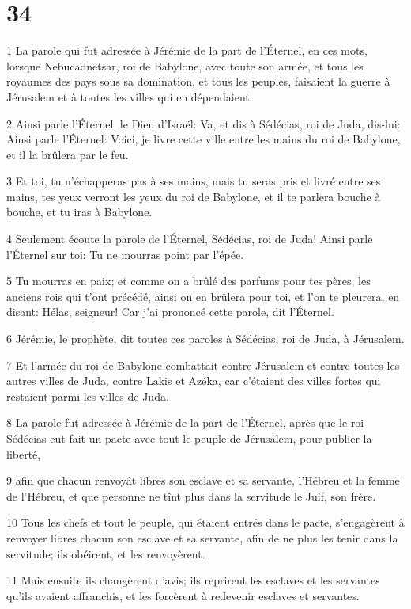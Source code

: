 \chapter{34}

\par 1 La parole qui fut adressée à Jérémie de la part de l'Éternel, en ces mots, lorsque Nebucadnetsar, roi de Babylone, avec toute son armée, et tous les royaumes des pays sous sa domination, et tous les peuples, faisaient la guerre à Jérusalem et à toutes les villes qui en dépendaient:
\par 2 Ainsi parle l'Éternel, le Dieu d'Israël: Va, et dis à Sédécias, roi de Juda, dis-lui: Ainsi parle l'Éternel: Voici, je livre cette ville entre les mains du roi de Babylone, et il la brûlera par le feu.
\par 3 Et toi, tu n'échapperas pas à ses mains, mais tu seras pris et livré entre ses mains, tes yeux verront les yeux du roi de Babylone, et il te parlera bouche à bouche, et tu iras à Babylone.
\par 4 Seulement écoute la parole de l'Éternel, Sédécias, roi de Juda! Ainsi parle l'Éternel sur toi: Tu ne mourras point par l'épée.
\par 5 Tu mourras en paix; et comme on a brûlé des parfums pour tes pères, les anciens rois qui t'ont précédé, ainsi on en brûlera pour toi, et l'on te pleurera, en disant: Hélas, seigneur! Car j'ai prononcé cette parole, dit l'Éternel.
\par 6 Jérémie, le prophète, dit toutes ces paroles à Sédécias, roi de Juda, à Jérusalem.
\par 7 Et l'armée du roi de Babylone combattait contre Jérusalem et contre toutes les autres villes de Juda, contre Lakis et Azéka, car c'étaient des villes fortes qui restaient parmi les villes de Juda.
\par 8 La parole fut adressée à Jérémie de la part de l'Éternel, après que le roi Sédécias eut fait un pacte avec tout le peuple de Jérusalem, pour publier la liberté,
\par 9 afin que chacun renvoyât libres son esclave et sa servante, l'Hébreu et la femme de l'Hébreu, et que personne ne tînt plus dans la servitude le Juif, son frère.
\par 10 Tous les chefs et tout le peuple, qui étaient entrés dans le pacte, s'engagèrent à renvoyer libres chacun son esclave et sa servante, afin de ne plus les tenir dans la servitude; ils obéirent, et les renvoyèrent.
\par 11 Mais ensuite ils changèrent d'avis; ils reprirent les esclaves et les servantes qu'ils avaient affranchis, et les forcèrent à redevenir esclaves et servantes.
